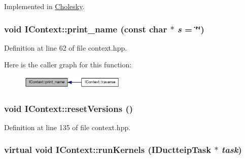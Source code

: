 Implemented in \hyperlink{class_cholesky_abba68c13e63db6e4f3637e0d68af9c45}{Cholesky}.\hypertarget{class_i_context_aa590239dd58b3946bfd9fc3d6725eef8}{
\subsubsection[{print\_\-name}]{\setlength{\rightskip}{0pt plus 5cm}void IContext::print\_\-name (const char $\ast$ {\em s} = {\ttfamily \char`\"{}\char`\"{}})}}
\label{class_i_context_aa590239dd58b3946bfd9fc3d6725eef8}


Definition at line 62 of file context.hpp.

Here is the caller graph for this function:\nopagebreak
\begin{figure}[H]
\begin{center}
\leavevmode
\includegraphics[width=142pt]{class_i_context_aa590239dd58b3946bfd9fc3d6725eef8_icgraph}
\end{center}
\end{figure}
\hypertarget{class_i_context_aa6dd00242c03b780fa3b2394288b00ad}{
\subsubsection[{resetVersions}]{\setlength{\rightskip}{0pt plus 5cm}void IContext::resetVersions ()}}
\label{class_i_context_aa6dd00242c03b780fa3b2394288b00ad}


Definition at line 135 of file context.hpp.\hypertarget{class_i_context_a7e432ff03dfc96f39e8343b28f17fb74}{
\subsubsection[{runKernels}]{\setlength{\rightskip}{0pt plus 5cm}virtual void IContext::runKernels ({\bf IDuctteipTask} $\ast$ {\em task})}}
\label{class_i_context_a7e432ff03dfc96f39e8343b28f17fb74}



